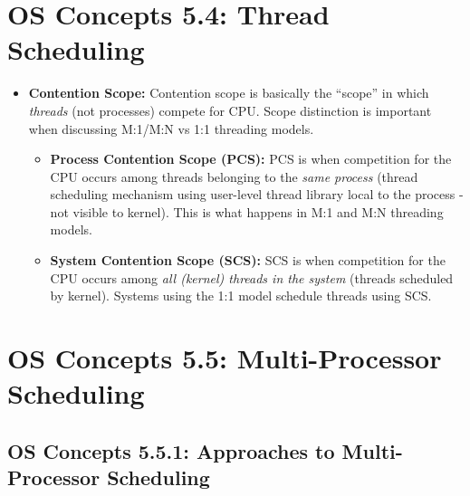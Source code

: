 \documentclass[12pt]{article}
\begin{document}
\section*{OS Concepts 5.4: Thread Scheduling}

\begin{itemize}
    \item \textbf{Contention Scope:} Contention scope is basically the ``scope'' in which \textit{threads} (not processes) compete for CPU. Scope distinction is important when discussing M:1/M:N vs 1:1 threading models.
        \begin{itemize}
            \item \textbf{Process Contention Scope (PCS):} PCS is when competition for the CPU occurs among threads belonging to the \textit{same process} (thread scheduling mechanism using user-level thread library local to the process - not visible to kernel). This is what happens in M:1 and M:N threading models.
            \item \textbf{System Contention Scope (SCS):} SCS is when competition for the CPU occurs among \textit{all (kernel) threads in the system} (threads scheduled by kernel). Systems using the 1:1 model schedule threads using SCS.
        \end{itemize}
\end{itemize}

\section*{OS Concepts 5.5: Multi-Processor Scheduling}

\subsection*{OS Concepts 5.5.1: Approaches to Multi-Processor Scheduling}
\end{document}
